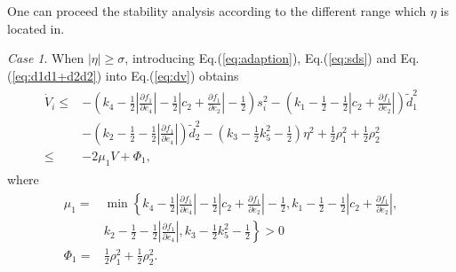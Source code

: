 \documentclass[ShortAfour]{sage}
\theoremstyle{plain}
\theoremstyle{remark}
\newtheorem{mycase}{Case}
\begin{document}
One can proceed the stability analysis according to the different range which $\eta$ is located in.
\begin{mycase}
  When $\vert\eta\vert\ge\sigma$, introducing Eq.(\ref{eq:adaption}), Eq.(\ref{eq:sds}) and Eq.(\ref{eq:d1d1+d2d2}) into Eq.(\ref{eq:dv})  obtains
  \begin{align}\begin{split}
    \dot V_i \le &-\left(k_4-\frac{1}{2}\left\vert\frac{\partial f_1}{\partial e_4}\right\vert-\frac{1}{2}\left\vert c_2+\frac{\partial f_1}{\partial e_2}\right\vert-\frac{1}{2}\right)s_i^2-\left(k_1-\frac{1}{2}-\frac{1}{2}\left\vert c_2+\frac{\partial f_1}{\partial e_2}\right\vert\right)\tilde{d}_1^2\\
    &-\left(k_2-\frac{1}{2}-\frac{1}{2}\left\vert\frac{\partial f_1}{\partial e_4}\right\vert\right)\tilde{d}_2^2-\left(k_3-\frac{1}{2}k_5^2-\frac{1}{2}\right)\eta^2+\frac{1}{2}\rho_1^2 +\frac{1}{2}\rho_2^2\\
    \le& -2\mu_1V+\Phi_1,\label{eq:dv1}
  \end{split}\end{align}
  where
  \begin{align}\begin{split}
    \mu_1 =& \min\left\{k_4-\frac{1}{2}\left\vert\frac{\partial f_1}{\partial e_4}\right\vert-\frac{1}{2}\left\vert c_2+\frac{\partial f_1}{\partial e_2}\right\vert-\frac{1}{2},k_1-\frac{1}{2}-\frac{1}{2}\left\vert c_2+\frac{\partial f_1}{\partial e_2}\right\vert,\right.\\
    &\left. k_2-\frac{1}{2}-\frac{1}{2}\left\vert\frac{\partial f_1}{\partial e_4}\right\vert,k_3-\frac{1}{2}k_5^2-\frac{1}{2}\right\}>0\\
    \Phi_1=&\frac{1}{2}\rho_1^2 +\frac{1}{2}\rho_2^2.
  \end{split}\end{align}
\end{mycase}
\end{document}

